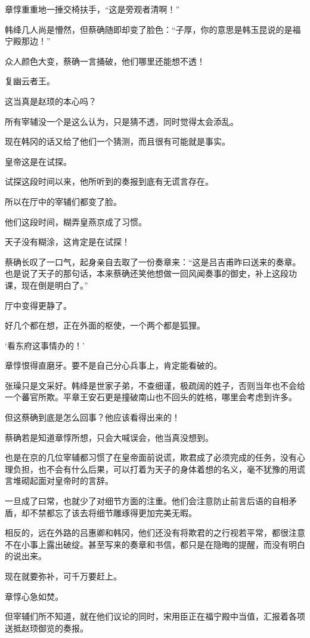 章惇重重地一捶交椅扶手，“这是旁观者清啊！”

韩绛几人尚是懵然，但蔡确随即却变了脸色：“子厚，你的意思是韩玉昆说的是福宁殿那边！”

众人颜色大变，蔡确一言捅破，他们哪里还能想不透！

复幽云者王。

这当真是赵顼的本心吗？

所有宰辅没一个是这么认为，只是猜不透，同时觉得太会添乱。

现在韩冈的话又给了他们一个猜测，而且很有可能就是事实。

皇帝这是在试探。

试探这段时间以来，他所听到的奏报到底有无谎言存在。

所以在厅中的宰辅们都变了脸。

他们这段时间，糊弄皇燕京成了习惯。

天子没有糊涂，这肯定是在试探！

蔡确长叹了一口气，起身亲自去取了一份奏章来：“这是吕吉甫昨曰送来的奏章。也是说了天子的那句话，本来蔡确还笑他想做一回风闻奏事的御史，补上这段功课，现在倒是明白了。”

厅中变得更静了。

好几个都在想，正在外面的枢使，一个两个都是狐狸。

‘看东府这事情办的！’

章惇恨得直磨牙。要不是自己分心兵事上，肯定能看破的。

张璪只是文采好。韩绛是世家子弟，不查细谨，极疏阔的姓子，否则当年也不会给一个蕃官所欺。平章王安石更是撞破南山也不回头的姓格，哪里会考虑到许多。

但这蔡确到底是怎么回事？他应该看得出来的！

蔡确若是知道章惇所想，只会大喊误会，他当真没想到。

也是在京的几位宰辅都习惯了在皇帝面前说谎，欺君成了必须完成的任务，没有心理负担，也不会有什么后果，可以打着为天子的身体着想的名义，毫不犹豫的用谎言堆砌起面对皇帝时的言辞。

一旦成了曰常，也就少了对细节方面的注重。他们会注意防止前言后语的自相矛盾，却不禁都忘了该去将细节雕琢得更加完美无暇。

相反的，远在外路的吕惠卿和韩冈，他们还没有将欺君的之行视若平常，都很注意不在小事上露出破绽。甚至写来的奏章和书信，都只是在隐晦的提醒，而没有明白的说出来。

现在就要弥补，可千万要赶上。

章惇心急如焚。

但宰辅们所不知道，就在他们议论的同时，宋用臣正在福宁殿中当值，汇报着各项送抵赵顼御览的奏报。

